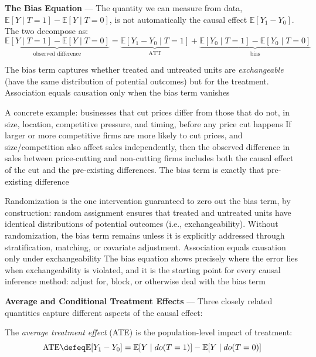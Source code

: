 \textbf{The Bias Equation} --- The quantity we can measure from data, $\mathbb{E}
[Y \mid T = 1] - \mathbb{E}[Y \mid T = 0]$, is not automatically the causal
effect $\mathbb{E}[Y_{1}- Y_{0}]$. The two decompose as:
\begin{equation}
  \underbrace{\mathbb{E}[Y \mid T = 1] - \mathbb{E}[Y \mid T = 0]}_{\text{observed
  difference}}= \underbrace{\mathbb{E}[Y_1 - Y_0 \mid T = 1]}_{\text{ATT}}+ \underbrace{\mathbb{E}[Y_0
  \mid T = 1] - \mathbb{E}[Y_0 \mid T = 0]}_{\text{bias}}\label{eq:bias-equation}
\end{equation}

The bias term captures whether treated and untreated units are \emph{exchangeable}
(have the same distribution of potential outcomes) but for the treatment. Association
equals causation only when the bias term vanishes

A concrete example: businesses that cut prices differ from those that do not, in
size, location, competitive pressure, and timing, before any price cut happens
If larger or more competitive firms are more likely to cut prices, and size/competition
also affect sales independently, then the observed difference in sales between
price-cutting and non-cutting firms includes both the causal effect of the cut
and the pre-existing differences. The bias term is exactly that pre-existing difference

Randomization is the one intervention guaranteed to zero out the bias term, by construction:
random assignment ensures that treated and untreated units have identical
distributions of potential outcomes (i.e., exchangeability). Without randomization,
the bias term remains unless it is explicitly addressed through stratification, matching,
or covariate adjustment. Association equals causation only under exchangeability
The bias equation shows precisely where the error lies when exchangeability is
violated, and it is the starting point for every causal inference method: adjust
for, block, or otherwise deal with the bias term

\textbf{Average and Conditional Treatment Effects} --- Three closely related
quantities capture different aspects of the causal effect:

The \emph{average treatment effect} (ATE) is the population-level impact of treatment:
\begin{equation}
  \text{ATE}\defeq \mathbb{E}[Y_{1}- Y_{0}] = \mathbb{E}[Y \mid do(T = 1)] - \mathbb{E}
  [Y \mid do(T = 0)] \label{eq:ate}
\end{equation}

